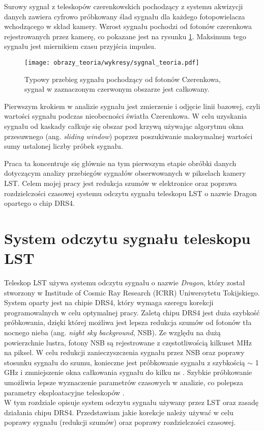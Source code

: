 \documentclass[a4paper,11pt,twoside]{article}
\begin{document}
Surowy sygnał z teleskopów czerenkowskich pochodzący z systemu akwizycji danych zawiera cyfrowo próbkowany ślad sygnału dla każdego fotopowielacza wchodzącego w skład kamery. Wzrost sygnału pochodzi od fotonów czerenkowa rejestrowanych przez kamerę, co pokazane jest na rysunku \ref{fig:signal_theory}.
Maksimum tego sygnału jest miernikiem czasu przyjścia impulsu.
\begin{figure}[H] 
\centering
\texttt{[image: obrazy\_teoria/wykresy/sygnal\_teoria.pdf]}
\caption{Typowy przebieg sygnału pochodzący od fotonów Czerenkowa, sygnał w zaznaczonym czerwonym obszarze jest całkowany.}
\label{fig:signal_theory}
\end{figure}

Pierwszym krokiem w analizie sygnału jest zmierzenie i odjęcie linii bazowej, czyli wartości sygnału podczas nieobecności światła Czerenkowa. W celu uzyskania sygnału od kaskady całkuje się obszar pod krzywą używając algorytmu okna przesuwnego (ang. \textsl{sliding window}) poprzez poszukiwanie maksymalnej wartości sumy ustalonej liczby próbek sygnału.

Praca ta koncentruje się głównie na tym pierwszym etapie obróbki danych dotyczącym analizy przebiegów sygnałów obserwowanych w pikselach kamery LST. Celem mojej pracy jest redukcja szumów w elektronice oraz poprawa rozdzielczości czasowej systemu odczytu sygnału teleskopu LST o nazwie Dragon opartego o chip DRS4.

\newpage
\section{System odczytu sygnału teleskopu LST}
Teleskop LST używa systemu odczytu sygnału o nazwie \textsl{Dragon}, który został stworzony w Institude of Cosmic Ray Research (ICRR) Uniwersytetu Tokijskiego. System oparty jest na chipie DRS4, który wymaga szeregu korekcji programowalnych w celu optymalnej pracy. Zaletą chipu DRS4 jest duża szybkość próbkowania, dzięki której możliwa jest lepsza redukcja szumów od fotonów tła nocnego nieba (ang. \textsl{night sky background}, NSB).
Ze względu na dużą powierzchnie lustra, fotony NSB są rejestrowane z częstotliwością kilkuset MHz na piksel. W celu redukcji zanieczyszczenia sygnału przez NSB oraz poprawy stosunku sygnału do szumu, konieczne jest próbkowanie  sygnału z szybkością $\sim$ 1 GHz i zmniejszenie okna całkowania sygnału do kilku ns \cite{dragon_lst}. Szybkie próbkowanie umożliwia lepsze wyznaczenie parametrów czasowych w analizie, co polepsza parametry eksploatacyjne teleskopów \cite{time_corr}. \\
W tym rozdziale opisuje system odczytu sygnału używany przez LST oraz zasadę działania chipu DRS4. Przedstawiam jakie korekcje należy używać w celu poprawy sygnału (redukcji szumów) oraz poprawy rozdzielczości czasowej. 
\end{document}
